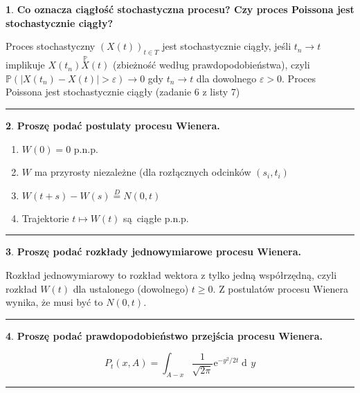 \documentclass[
    twocolumn,
    twoside,
    fontsize=11pt,
    paper=A0,
    DIV=30
]{scrartcl}
\theoremstyle{definition}
\newtheorem{pytanie}{}
\theoremstyle{break}
\newenvironment{odpowiedź}{\vspace{-0.7em}}{\vspace{0.3em}\hrule}
\newcommand*{\e}{\mathrm{e}}
\DeclareMathOperator{\diff}{d\!}
\begin{document}
\begin{pytanie}
\textbf{Co oznacza ciągłość stochastyczna procesu? Czy proces Poissona jest stochastycznie ciągły?}
\end{pytanie}
\begin{odpowiedź}
    Proces stochastyczny $(X(t))_{t \in T}$ jest stochastycznie
    ciągły, jeśli $t_n \to t$ implikuje $X(t_n) \overset {\mathbb{P}} X(t)$
    (zbieżność według prawdopodobieństwa), czyli
    $\mathbb{P}(|X(t_n) - X(t)| > \varepsilon) \to 0$ gdy $t_n \to t$ dla
    dowolnego $\varepsilon > 0$. Proces Poissona jest stochastycznie
    ciągły (zadanie 6 z listy 7)
\end{odpowiedź}


\begin{pytanie}
\textbf{Proszę podać postulaty procesu Wienera.}
\end{pytanie}
\begin{odpowiedź}
\begin{enumerate}
    \item $W(0) = 0$ p.n.p.
    \item $W$ ma przyrosty niezależne (dla rozłącznych odcinków $(s_i, t_i)$
    \item $W(t+s) - W(s) \overset D = N(0, t)$
    \item Trajektorie $t \mapsto W(t)$ są ciągłe p.n.p.
\end{enumerate}
\end{odpowiedź}


\begin{pytanie}
\textbf{Proszę podać rozkłady jednowymiarowe procesu Wienera.}
\end{pytanie}
\begin{odpowiedź}
    Rozkład jednowymiarowy to rozkład wektora z tylko jedną współrzędną,
    czyli rozkład $W(t)$ dla ustalonego (dowolnego) $t \geq 0$.
    Z postulatów procesu Wienera wynika, że musi być to $N(0, t)$.
\end{odpowiedź}


\begin{pytanie}
\textbf{Proszę podać prawdopodobieństwo przejścia procesu Wienera.}
\end{pytanie}
\begin{odpowiedź}
\[
    P_t(x, A) = \int_{A - x}\frac 1 {\sqrt{2\pi}} \e^{-y^2/2t} \diff y
\] 
\end{odpowiedź}
\end{document}
